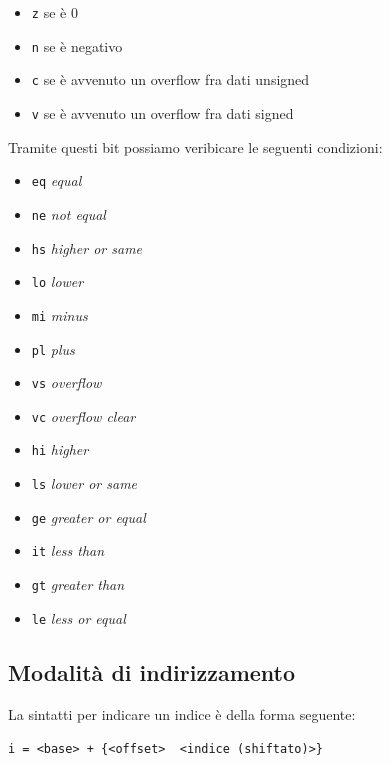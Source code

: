 \begin{itemize}
	\item \verb|z| se è 0
	\item \verb|n| se è negativo
	\item \verb|c| se è avvenuto un overflow fra dati unsigned
	\item \verb|v| se è avvenuto un overflow fra dati signed
\end{itemize}
Tramite questi bit possiamo veribicare le seguenti condizioni:
\begin{itemize}
	\item \verb|eq| \textit{equal}
	\item \verb|ne| \textit{not equal}
	\item \verb|hs| \textit{higher or same}
	\item \verb|lo| \textit{lower}
	\item \verb|mi| \textit{minus}
	\item \verb|pl| \textit{plus}
	\item \verb|vs| \textit{overflow}
	\item \verb|vc| \textit{overflow clear}
	\item \verb|hi| \textit{higher}
	\item \verb|ls| \textit{lower or same}
	\item \verb|ge| \textit{greater or equal}
	\item \verb|it| \textit{less than}
	\item \verb|gt| \textit{greater than}
	\item \verb|le| \textit{less or equal}
\end{itemize}
\subsection{Modalità di indirizzamento}
La sintatti per indicare un indice è della forma seguente:
\begin{center}
	\verb|i = <base> + {<offset>  <indice (shiftato)>}|
\end{center}
